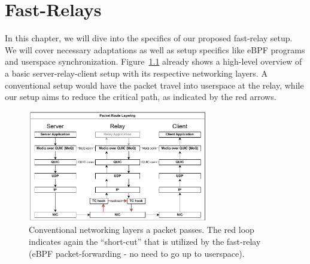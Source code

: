
\chapter{Fast-Relays}\label{chap:fast_relays}

In this chapter, we will dive into the specifics of our proposed fast-relay setup.
We will cover necessary adaptations as well as setup specifics like eBPF programs 
and userspace synchronization.
Figure~\ref{fig:route-layering} already shows a high-level overview of a basic 
server-relay-client setup with its respective networking layers.
A conventional setup would have the packet travel into userspace at the relay, 
while our setup aims to reduce the critical path, as indicated by the red arrows.

\vspace{0.5cm}
\begin{figure}[htbp] %
    \centering
    \includegraphics[width=0.7\textwidth]{figures/02_background/route-layering.drawio.pdf}
    \caption[Packet path schematic regarding network stack]{Conventional networking layers a packet passes.
    The red loop indicates again the ``short-cut'' that is utilized by the fast-relay 
    (eBPF packet-forwarding {-} no need to go up to userspace).}\label{fig:route-layering}
\end{figure}







